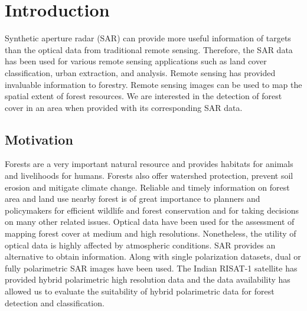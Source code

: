 
\chapter{Introduction} %

\label{Chapter 1} %


Synthetic aperture radar (SAR) can provide more useful information of targets than the optical data from traditional remote sensing. Therefore, the SAR data has been used for various remote sensing applications such as land cover classification, urban extraction, and analysis. Remote sensing has provided invaluable information to forestry. Remote sensing images can be used to map the spatial extent of forest resources. We are interested in the detection of forest cover in an area when provided with its corresponding SAR data.


\section{Motivation}

Forests are a very important natural resource and provides habitats for animals and livelihoods for humans. Forests also offer watershed protection, prevent soil erosion and mitigate climate change. Reliable and timely information on forest area and land use nearby forest is of great importance to planners and policymakers for efficient wildlife and forest conservation and for taking decisions on many other related issues. Optical data have been used for the assessment of mapping forest cover at medium and high resolutions. Nonetheless, the utility of optical data is highly affected by atmospheric conditions. SAR provides an alternative to obtain information. Along with single polarization datasets, dual or fully polarimetric SAR images have been used. The Indian RISAT-1 satellite has provided hybrid polarimetric high resolution data and the data availability has allowed us to evaluate the suitability of hybrid polarimetric data for forest detection and classification. 

